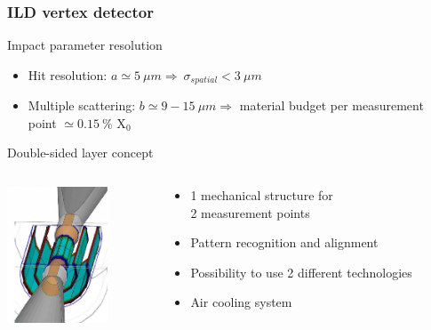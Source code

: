 \documentclass{beamer}
\begin{document}

\begin{frame}
  \frametitle{ILD vertex detector}

  \vspace{-0.3cm}
  \begin{alertblock}{Impact parameter resolution}
    \begin{itemize}
      \item Hit resolution: $a \simeq 5~\mu m \Rightarrow ~ \sigma_{spatial} < 3~\mu m$
      \item Multiple scattering: $b \simeq 9 - 15~\mu m \Rightarrow$ material budget per measurement point $\simeq 0.15~\%$ X$_0$ 
    \end{itemize}
  \end{alertblock}

  \vspace{-0.2cm}
  \begin{block}{Double-sided layer concept}
    \begin{columns}[c]
      \begin{column}{3cm}
        \vspace*{-0.1cm}
        \centering
        \includegraphics[width = 3cm]{Pictures/ild_vxd_3layers.jpg}
      \end{column}
      \begin{column}{7cm}
        \centering
        \begin{itemize}
          \item 1 mechanical structure for \\ 2 measurement points
          \item Pattern recognition and alignment
          \item Possibility to use 2 different technologies
          \item Air cooling system
        \end{itemize}
      \end{column}
    \end{columns}
  \end{block}

\end{frame}
\end{document}
